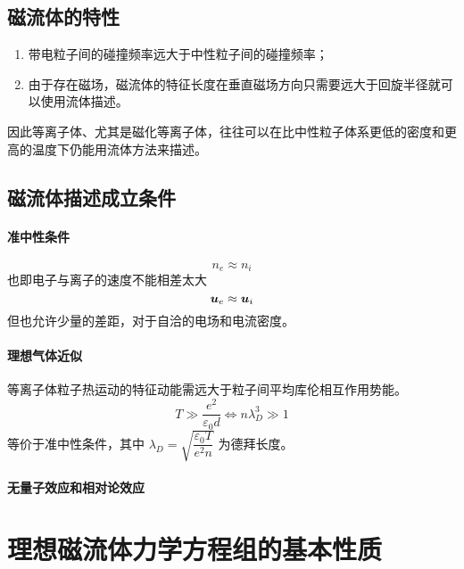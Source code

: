 \subsection{磁流体的特性}

\begin{enumerate}
    \item 带电粒子间的碰撞频率远大于中性粒子间的碰撞频率；
    \item 由于存在磁场，磁流体的特征长度在垂直磁场方向只需要远大于回旋半径就可以使用流体描述。
\end{enumerate}

因此等离子体、尤其是磁化等离子体，往往可以在比中性粒子体系更低的密度和更高的温度下仍能用流体方法来描述。

\subsection{磁流体描述成立条件}

\paragraph{准中性条件}
\begin{equation}
    n_e \approx n_i
\end{equation}
也即电子与离子的速度不能相差太大
\begin{equation}
    \bm{u}_e \approx \bm{u}_i
\end{equation}
但也允许少量的差距，对于自洽的电场和电流密度。

\paragraph{理想气体近似}
等离子体粒子热运动的特征动能需远大于粒子间平均库伦相互作用势能。
\begin{equation}
    T \gg \frac{e^2}{\varepsilon_0 d}
    \iff n \lambda_D^3 \gg 1
\end{equation}
等价于准中性条件，其中 $\lambda_D = \sqrt{\dfrac{\varepsilon_0 T}{e^2 n}}$ 为德拜长度。

\paragraph{无量子效应和相对论效应}

\section{理想磁流体力学方程组的基本性质}

